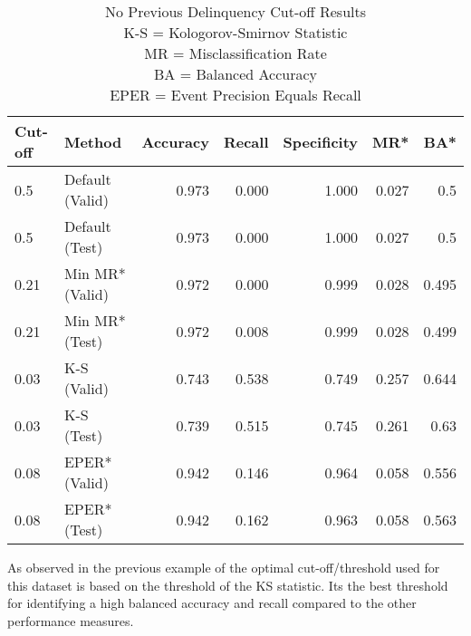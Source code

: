 \begin{table}[H]
	\centering
	\resizebox{\textwidth}{!}
	{
		\begin{tabular}{l|l|r|r|r|r|r|}
			\hline
			\textbf{Cut-off} & \textbf{Method} & \textbf{Accuracy} & \textbf{Recall} & \textbf{Specificity} & \textbf{MR*} & \textbf{BA*}  \\ \hline
			0.5             & Default (Valid)  & 0.973             & 0.000           & 1.000                & 0.027  & 0.5     \\
			0.5             & Default (Test)   & 0.973             & 0.000           & 1.000                & 0.027  & 0.5     \\ \hline
			
			0.21            & Min MR* (Valid)   & \cellcolor{yellow!25}0.972             & 0.000           & \cellcolor{yellow!25}0.999                & \cellcolor{yellow!25}0.028    & 0.495   \\
			0.21            & Min MR* (Test)    & 0.972             & 0.008           & 0.999                & 0.028  & 0.499     \\ \hline
			
			0.03            & K-S (Valid)      & 0.743             & \cellcolor{yellow!25}0.538           & 0.749                & 0.257  & \cellcolor{yellow!25}0.644     \\
			0.03            & K-S (Test)       & 0.739             & 0.515           & 0.745                & 0.261  & 0.63     \\ \hline
			
			0.08            & EPER* (Valid)     & 0.942             & 0.146           & 0.964                & 0.058    & 0.556   \\
			0.08            & EPER* (Test)      & 0.942             & 0.162           & 0.963                & 0.058 & 0.563     \\ \hline
		\end{tabular}
	}
	\caption{No Previous Delinquency Cut-off Results
			\\ K-S = Kologorov-Smirnov Statistic
			\\ MR = Misclassification Rate
			\\ BA = Balanced Accuracy
			\\ EPER = Event Precision Equals Recall
			}
	\label{table:NoDelinquencyModelCutoff}
\end{table}

As observed in the previous example of the optimal cut-off/threshold used for this dataset is based on the threshold of the KS statistic. Its the best threshold for identifying a high balanced accuracy and recall compared to the other performance measures. 

